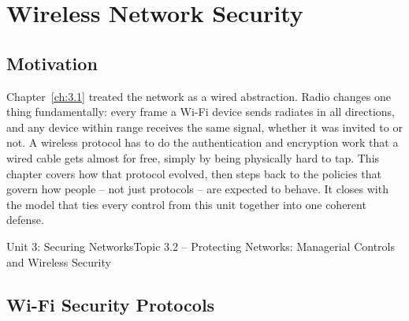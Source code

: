 \chapter{Wireless Network Security}
\label{ch:3.2}


\section{Motivation}

Chapter~\ref{ch:3.1} treated the network as a wired abstraction. Radio changes one thing
fundamentally: every frame a Wi-Fi device sends radiates in all directions, and any device within
range receives the same signal, whether it was invited to or not. A wireless protocol has to do the
authentication and encryption work that a wired cable gets almost for free, simply by being
physically hard to tap. This chapter covers how that protocol evolved, then steps back to the
policies that govern how people -- not just protocols -- are expected to behave. It closes with the
model that ties every control from this unit together into one coherent defense.

\begin{apalignment}{Unit 3: Securing Networks}{Topic 3.2 -- Protecting Networks: Managerial Controls and Wireless Security}
\begin{apobjectives}
\end{apobjectives}
\end{apalignment}

\section{Wi-Fi Security Protocols}

